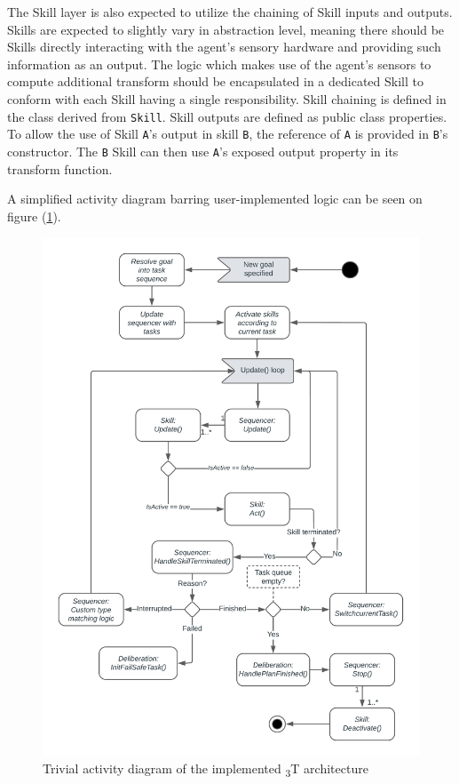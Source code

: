 \documentclass[main.tex]{subfiles}
\begin{document}
The Skill layer is also expected to utilize the chaining of Skill inputs and outputs. Skills are 
expected to slightly vary in abstraction level, meaning there should be Skills directly 
interacting with the agent's sensory hardware and providing such information as an output. 
The logic which makes use of the agent's sensors to compute additional transform should be encapsulated in
a dedicated Skill to conform with each Skill having a single responsibility. Skill chaining 
is defined in the class derived from \texttt{Skill}. Skill outputs are defined as 
public class properties. To allow the use of Skill \texttt{A}'s output in skill \texttt{B},
the reference of \texttt{A} is provided in \texttt{B}'s constructor. The \texttt{B} Skill 
can then use \texttt{A}'s exposed output property in its transform function.

A simplified activity diagram barring user-implemented logic can be seen on 
figure (\ref{fig-activity-diagram}).

\begin{figure}[htbp]
    \centering
    \includegraphics[width=.9\textwidth]{3T-Activity-diagram.png}
    \caption{Trivial activity diagram of the implemented \textsubscript{3}T architecture}
    \label{fig-activity-diagram}
\end{figure}
\end{document}
